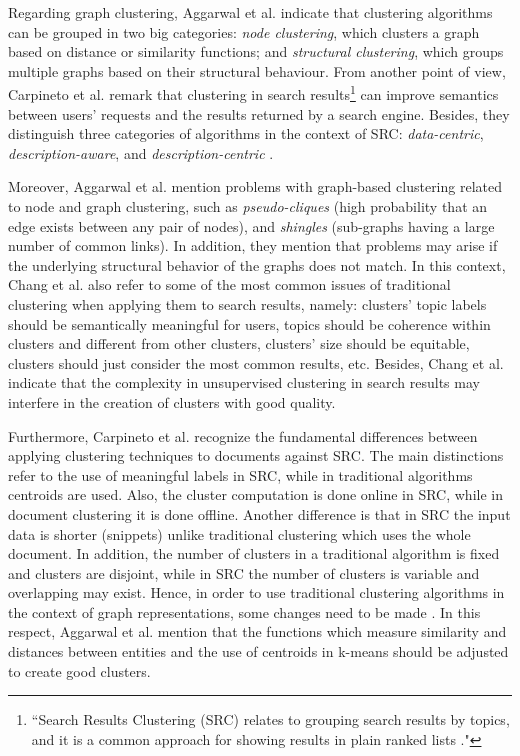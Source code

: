 \documentclass[runningheads]{llncs}
\begin{document}
Regarding graph clustering, Aggarwal et al. \cite{Aggarwal} indicate that clustering algorithms can be grouped in two big categories: \textit{node clustering}, which clusters a graph based on distance or similarity functions; and \textit{structural clustering}, which groups multiple graphs based on their structural behaviour. From another point of view, Carpineto et al. \cite{Carpineto} remark that clustering in search results\footnote{``Search Results Clustering (SRC) relates to grouping search results by topics, and it is a common approach for showing results in plain ranked lists \cite{Chang}."} can improve semantics between users' requests and the results returned by a search engine. Besides, they distinguish three categories of algorithms in the context of SRC: \textit{data-centric}, \textit{description-aware}, and \textit{description-centric} \cite{Carpineto}.

Moreover, Aggarwal et al. \cite{Aggarwal} mention problems with graph-based clustering related to node and graph clustering, such as \textit{pseudo-cliques} (high probability that an edge exists between any pair of nodes), and \textit{shingles} (sub-graphs having a large number of common links). In addition, they mention that problems may arise if the underlying structural behavior of the graphs does not match. In this context, Chang et al. \cite{Chang} also refer to some of the most common issues of traditional clustering when applying them to search results, namely: clusters' topic labels should be semantically meaningful for users, topics should be coherence within clusters and different from other clusters, clusters' size should be equitable, clusters should just consider the most common results, etc. Besides, Chang et al. \cite{Chang} indicate that the complexity in unsupervised clustering in search results may interfere in the creation of clusters with good quality.

Furthermore, Carpineto et al. \cite{Carpineto} recognize the fundamental differences between applying clustering techniques to documents against SRC. The main distinctions refer to the use of meaningful labels in SRC, while in traditional algorithms centroids are used. Also, the cluster computation is done online in SRC, while in document clustering it is done offline. Another difference is that in SRC the input data is shorter (snippets) unlike traditional clustering which uses the whole document. In addition, the number of clusters in a traditional algorithm is fixed and clusters are disjoint, while in SRC the number of clusters is variable and overlapping may exist. Hence, in order to use traditional clustering algorithms in the context of graph representations, some changes need to be made \cite{Aggarwal}. In this respect, Aggarwal et al. \cite{Aggarwal} mention that the functions which measure similarity and distances between entities and the use of centroids in k-means should be adjusted to create good clusters.
\end{document}
